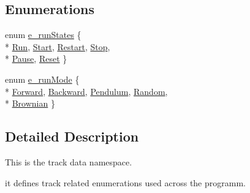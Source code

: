 \subsection*{Enumerations}
\begin{DoxyCompactItemize}
\item 
enum \hyperlink{namespaceTrackData_a1f6cb5d332e1b568ce544e933ad6dcc7}{e\-\_\-run\-States} \{ \\*
\hyperlink{namespaceTrackData_a1f6cb5d332e1b568ce544e933ad6dcc7adba1cf637ce75004f209f30d6e901fb2}{Run}, 
\hyperlink{namespaceTrackData_a1f6cb5d332e1b568ce544e933ad6dcc7a7e377e9b187bb3fe41cc3abb7c1000dd}{Start}, 
\hyperlink{namespaceTrackData_a1f6cb5d332e1b568ce544e933ad6dcc7adce7bd1a10c7d4e118ab46c8d1f0c310}{Restart}, 
\hyperlink{namespaceTrackData_a1f6cb5d332e1b568ce544e933ad6dcc7aabe0345f9f97dd34ee0f3ab84077a492}{Stop}, 
\\*
\hyperlink{namespaceTrackData_a1f6cb5d332e1b568ce544e933ad6dcc7ab164089ad5c23ddd1e53bf698ddb6971}{Pause}, 
\hyperlink{namespaceTrackData_a1f6cb5d332e1b568ce544e933ad6dcc7a10489ad21e92b0f57e824169fd97c580}{Reset}
 \}
\item 
enum \hyperlink{namespaceTrackData_aee95b22badc499497f21423c5033cfc1}{e\-\_\-run\-Mode} \{ \\*
\hyperlink{namespaceTrackData_aee95b22badc499497f21423c5033cfc1a0c9b53757a0ef19d09b6281d3651a826}{Forward}, 
\hyperlink{namespaceTrackData_aee95b22badc499497f21423c5033cfc1ad59e0242d593d0fcef1e31bb2f7bbfa3}{Backward}, 
\hyperlink{namespaceTrackData_aee95b22badc499497f21423c5033cfc1a5fe6058d599c165015d16aa282dbf0d1}{Pendulum}, 
\hyperlink{namespaceTrackData_aee95b22badc499497f21423c5033cfc1a8d416cfcf50b8878a9c1c9c2f1ccb784}{Random}, 
\\*
\hyperlink{namespaceTrackData_aee95b22badc499497f21423c5033cfc1ab05c16fe3ae371b1be6790bf03598daa}{Brownian}
 \}
\end{DoxyCompactItemize}


\subsection{Detailed Description}
This is the track data namespace.\par
 it defines track related enumerations used across the programm. 

